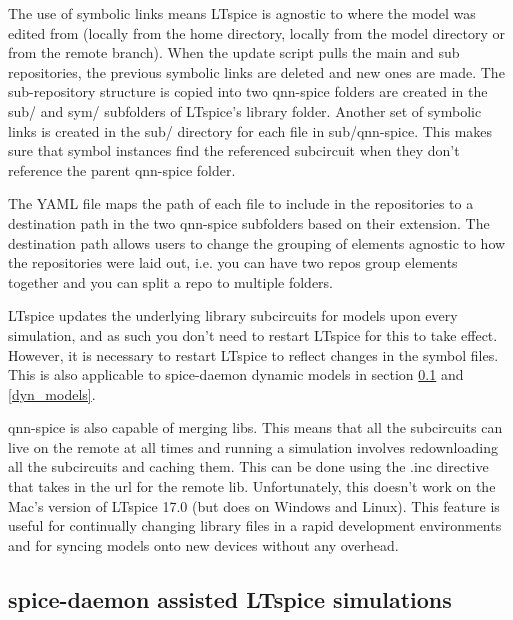 \documentclass[]{article}
\newcommand{\todoidea}[2][]{}
\newcommand{\todoexplain}[2][]{}
\newcommand{\cf}[1]{\textsf{#1}}
\begin{document}
The use of symbolic links means LTspice is agnostic to where the model was edited from
(locally from the home directory, locally from the model directory or from the remote branch).
When the update script pulls the main and sub repositories, the previous symbolic links are deleted and new ones are 
made. The sub-repository structure is copied into two \cf{qnn-spice} folders are created in the \cf{sub/} and \cf{sym/} 
subfolders of LTspice's library folder. Another set of symbolic links is created in the
\cf{sub/} directory for each file in \cf{sub/qnn-spice}. This makes sure that symbol
instances find the referenced subcircuit when they don't reference the parent \cf{qnn-spice}
folder.

The YAML file maps the path of each file to include in the repositories to a destination path in the two
\cf{qnn-spice} subfolders based on their extension. 
The destination path allows users to change the grouping of elements agnostic to how the repositories
were laid out, i.e. you can have two repos group elements together and you can split a
repo to multiple folders. 

LTspice updates the underlying library subcircuits for models upon every simulation,
and as such you don't need to restart LTspice for this to take effect. However,
it is necessary to restart LTspice to reflect changes in the symbol files. This is 
also applicable to spice-daemon dynamic models in section \ref{sd_models} and \ref{dyn_models}.

qnn-spice is also capable of merging libs. This means that all the subcircuits can live
on the remote at all times and running a simulation involves redownloading all the 
subcircuits and caching them. This can be done using the \cf{.inc} directive that takes
in the url for the remote lib.
Unfortunately, this doesn't work on the Mac's version of LTspice \cf{17.0} (but does on
Windows and Linux). This feature is useful for continually changing library files in 
a rapid development environments and for syncing models onto new devices without 
any overhead.


\todoexplain[inline]{Include library location? vs. repo loc.}

\subsection{spice-daemon assisted LTspice simulations}\label{sd_models}
\end{document}
